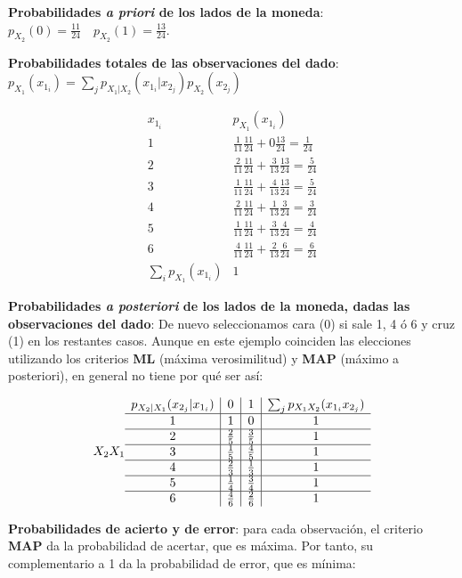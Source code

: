 \documentclass[11pt]{article}
\begin{document}
    \textbf{Probabilidades \emph{a priori} de los lados de la moneda}:
\(p_{X_2}(0)= \frac{11}{24} \quad p_{X_2}(1)= \frac{13}{24}\).

\textbf{Probabilidades totales de las observaciones del dado}:
\(p_{X_1}(x_{1_i}) = \sum_j p_{X_1 | X_2}(x_{1_i} | x_{2_j})p_{X_2}(x_{2_j})\)

\[
\begin{array}{c|c}
x_{1_i}& p_{X_1}(x_{1_i}) \\
\hline
1 & \frac{1}{11}\frac{11}{24}+ 0\frac{13}{24}=\frac{1}{24}\\
\hline
2 & \frac{2}{11}\frac{11}{24} + \frac{3}{13}\frac{13}{24}=\frac{5}{24}\\
\hline
3 & \frac{1}{11}\frac{11}{24} + \frac{4}{13}\frac{13}{24}=\frac{5}{24}\\
\hline
4 & \frac{2}{11}\frac{11}{24} + \frac{1}{13}\frac{3}{24}=\frac{3}{24}\\
\hline
5 & \frac{1}{11}\frac{11}{24} + \frac{3}{13}\frac{4}{24}=\frac{4}{24}\\
\hline
6 & \frac{4}{11}\frac{11}{24} + \frac{2}{13}\frac{6}{24}=\frac{6}{24}\\
\hline
\sum_i p_{X_1}(x_{1_i}) & 1 
\end{array}
\]

    \textbf{Probabilidades \emph{a posteriori} de los lados de la moneda,
dadas las observaciones del dado}: De nuevo seleccionamos cara (0) si
sale 1, 4 ó 6 y cruz (1) en los restantes casos. Aunque en este ejemplo
coinciden las elecciones utilizando los criterios \textbf{ML} (máxima
verosimilitud) y \textbf{MAP} (máximo a posteriori), en general no tiene
por qué ser así:

\[
X_2 \\X_1 \begin{array}{c|c|c|c}
p_{X_2 | X_1}(x_{2_j} | x_{1_i}) & 0 & 1 & \sum_j p_{X_1X_2}(x_{1_i}x_{2_j})\\
\hline
1 & 1 & 0 & 1\\
\hline
2 & \frac{2}{5} & \frac{3}{5} & 1\\
\hline
3 & \frac{1}{5} & \frac{4}{5} & 1\\
\hline
4 & \frac{2}{3} & \frac{1}{3} & 1\\
\hline
5 & \frac{1}{4} & \frac{3}{4} & 1\\
\hline
6 & \frac{4}{6} & \frac{2}{6} & 1\\
\end{array}
\]

    \textbf{Probabilidades de acierto y de error}: para cada observación, el
criterio \textbf{MAP} da la probabilidad de acertar, que es máxima. Por
tanto, su complementario a 1 da la probabilidad de error, que es mínima:
\end{document}
